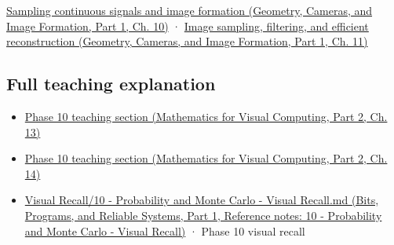 \href{../03-Geometry-Cameras-and-Image-Formation-P01/main.pdf\#nameddest=03-visual-computing-i-ch003-sampling-continuous-signals-and-image-formation}{Sampling continuous signals and image formation (Geometry, Cameras, and Image Formation, Part 1, Ch. 10)} · \href{../03-Geometry-Cameras-and-Image-Formation-P01/main.pdf\#nameddest=03-visual-computing-i-ch004-image-sampling-filtering-and-efficient-reconstruction}{Image sampling, filtering, and efficient reconstruction (Geometry, Cameras, and Image Formation, Part 1, Ch. 11)}

\subsection{Full teaching explanation}\label{appendix-6a7869dd79a6-full-teaching-explanation}

\hypertarget{appendix-6a7869dd79a6-full-teaching-explanation}{}

\begin{itemize}
\tightlist
\item
  \href{../02-Mathematics-for-Visual-Computing-P02/main.pdf\#nameddest=02-foundations-ii-ch029-a-computer-produces-deterministic-pseudorandom-sequences}{Phase 10 teaching section (Mathematics for Visual Computing, Part 2, Ch. 13)}
\item
  \href{../02-Mathematics-for-Visual-Computing-P02/main.pdf\#nameddest=02-foundations-ii-ch030-monte-carlo-estimates-trade-computation-for-uncertainty}{Phase 10 teaching section (Mathematics for Visual Computing, Part 2, Ch. 14)}
\item
  \href{../01-Bits-Programs-and-Reliable-Systems-P01/main.pdf\#nameddest=appendix-cb5af353ef77}{Visual Recall/10 - Probability and Monte Carlo - Visual Recall.md (Bits, Programs, and Reliable Systems, Part 1, Reference notes: 10 - Probability and Monte Carlo - Visual Recall)} · Phase 10 visual recall
\end{itemize}
